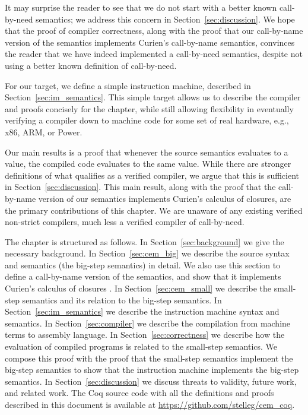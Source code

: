It may surprise the reader to see that we do not start with a better known
call-by-need semantics; we address this concern in
Section~\ref{sec:discussion}.  We hope that the proof of compiler correctness,
along with the proof that our call-by-name version of the semantics implements
Curien's call-by-name semantics, convinces the reader that we have indeed
implemented a call-by-need semantics, despite not using a better known
definition of call-by-need. 

For our target, we define a simple instruction machine, described in
Section~\ref{sec:im_semantics}. This simple target allows us to describe the
compiler and proofs concisely for the chapter, while still allowing
flexibility in eventually verifying a compiler down to machine code for some
set of real hardware, e.g., x86, ARM, or Power. 

Our main results is a proof that whenever the source semantics evaluates to a
value, the compiled code evaluates to the same value. While there are stronger
definitions of what qualifies as a verified compiler, we argue that this is
sufficient in Section~\ref{sec:discussion}. This main result, along with the
proof that the call-by-name version of our semantics implements Curien's
calculus of closures, are the primary contributions of this chapter. We are
unaware of any existing verified non-strict compilers, much less a verified
compiler of call-by-need. 

The chapter is structured as follows. In Section~\ref{sec:background} we give the
necessary background. In Section~\ref{sec:cem_big} we describe the source syntax
and semantics (the big-step \ce semantics) in detail.  We also use
this section to define a call-by-name version of the semantics, and
show that it implements Curien's calculus of closures \cite{curien1991abstract}.  In
Section~\ref{sec:cem_small} we describe the small-step \ce semantics
and its relation to the big-step semantics. In Section~\ref{sec:im_semantics}
we describe the instruction machine syntax and semantics. In
Section~\ref{sec:compiler} we describe the compilation from machine terms to
assembly language. In Section~\ref{sec:correctness} we describe how the evaluation
of compiled programs is related to the small-step \ce semantics. We
compose this proof with the proof that the small-step semantics implement the
big-step semantics to show that the instruction machine implements the big-step
semantics. In Section~\ref{sec:discussion} we discuss threats to validity,
future work, and related work. The Coq source code with all the definitions and
proofs described in this document is available at
\url{https://github.com/stelleg/cem\_coq}. 
